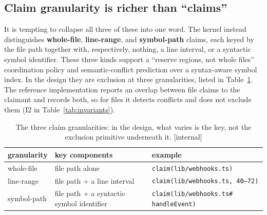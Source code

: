\documentclass[11pt,a4paper]{article}
\theoremstyle{definition}
\theoremstyle{remark}
\begin{document}
\subsection{Claim granularity is richer than ``claims''}
It is tempting to collapse all three of these into one word. The kernel instead
distinguishes \textbf{whole-file}, \textbf{line-range}, and \textbf{symbol-path}
claims, each keyed by the file path together with, respectively, nothing, a
line interval, or a syntactic symbol identifier. These three kinds support a
``reserve regions, not whole files'' coordination policy and semantic-conflict
prediction over a syntax-aware symbol index. In the design they are
exclusion at three granularities, listed in Table~\ref{tab:swk-claim-granularity}.
The reference implementation reports an overlap between file claims to the
claimant and records both, so for files it detects conflicts and does not
exclude them (I2 in Table~\ref{tab:invariants}).
\begin{table}[H]
\centering
\caption{The three claim granularities: in the design, what varies is the key,
not the exclusion primitive underneath it. [internal]}
\label{tab:swk-claim-granularity}
\small
\renewcommand{\arraystretch}{1.2}
\begin{tabularx}{\textwidth}{@{}>{\raggedright\arraybackslash}p{} >{\raggedright\arraybackslash}X >{\raggedright\arraybackslash}X@{}}
\toprule
\textbf{granularity} & \textbf{key components} & \textbf{example} \\
\midrule
whole-file & file path alone & \texttt{claim(lib/webhooks.ts)} \\
line-range & file path + a line interval & \texttt{claim(lib/webhooks.ts, 40--72)} \\
symbol-path & file path + a syntactic symbol identifier & \texttt{claim(lib/webhooks.ts\#} \newline \texttt{handleEvent)} \\
\bottomrule
\end{tabularx}
\end{table}
\end{document}
